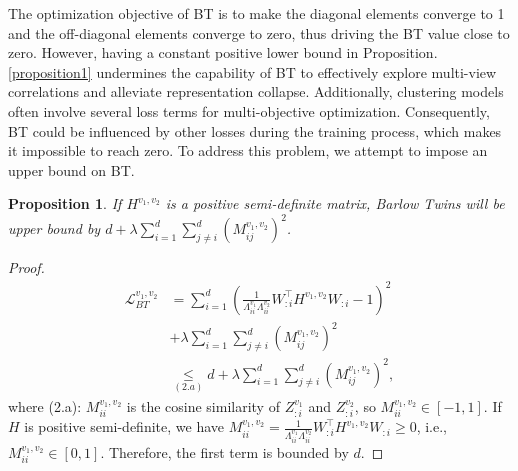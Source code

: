 \documentclass[letterpaper]{article} %
\newtheorem{proposition}{Proposition}
\begin{document}
The optimization objective of BT is to make the diagonal elements converge to 1 and the off-diagonal elements converge to zero, thus driving the BT value close to zero. However, having a constant positive lower bound in Proposition. \ref{proposition1} undermines the capability of BT to effectively explore multi-view correlations and alleviate representation collapse. Additionally, clustering models often involve several loss terms for multi-objective optimization. Consequently, BT could be influenced by other losses during the training process, which makes it impossible to reach zero. To address this problem, we attempt to impose an upper bound on BT.


\begin{proposition}\label{remark1}
If $H^{v_1, v_2}$ is a positive semi-definite matrix,  
Barlow Twins will be upper bound by $d+\lambda \sum_{i=1}^{d} \sum_{j \neq i}^d (M^{v_1, v_2}_{i j })^{2}$. 
\end{proposition} 



\begin{proof}
\begin{equation}
    \begin{aligned}
    \mathcal{L}^{v_1,v_2}_{BT} 
    &= \sum_{i=1}^{d} (\frac{1}{\Lambda^{v_1}_{ii} \Lambda^{v_2}_{ii}} {W}_{:i}^{\top} H^{v_1, v_2} {W}_{:i}-1)^{2} \\
    &+\lambda \sum_{i=1}^{d} \sum_{j \neq i}^d (M^{v_1, v_2}_{i j})^{2}\\
    &\underset{(2.a)}{\leq} d+\lambda \sum_{i=1}^{d} \sum_{j \neq i}^d (M^{v_1, v_2}_{i j })^{2},
\end{aligned}
\end{equation}
where (2.a): $M^{v_1, v_2}_{i i}$ is the cosine similarity of $Z^{v_{1}}_{: i}$ and $Z^{v_{2}}_{: i}$, so $M^{v_1, v_2}_{ i i }\in [-1,1]$. If $H$ is  positive semi-definite, we have $M^{v_1, v_2}_{i i}=\frac{1}{\Lambda^{v_1}_{ii} \Lambda^{v_2}_{ii}} {W}_{:i}^{\top} H^{v_1, v_2} {W}_{:i} \geq 0 $, i.e., $M^{v_1, v_2}_{ i i }\in [0,1]$. Therefore, the first term is bounded by $d$.
\end{proof}
\end{document}
